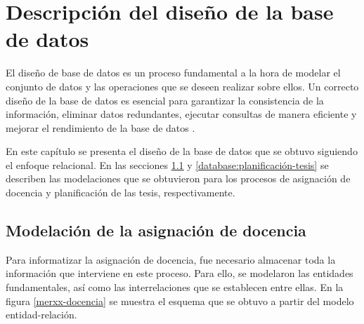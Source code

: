 \chapter{Descripción del diseño de la base de datos}\label{chapter:database}

El diseño de base de datos es un proceso fundamental a la hora 
de modelar el conjunto de datos y las operaciones que se deseen
realizar sobre ellos. Un correcto diseño de la base de datos
es esencial para garantizar la consistencia de la información,
eliminar datos redundantes, ejecutar consultas de manera 
eficiente y mejorar el rendimiento de la base de datos \cite{db_book_cap2}. 

En este capítulo se presenta el diseño de la base de datos que se 
obtuvo siguiendo el enfoque relacional.
En las secciones \ref{database:asignación-docencia} y
\ref{database:planificación-tesis} se describen las modelaciones que se obtuvieron 
para los procesos de asignación de docencia y planificación de las tesis, respectivamente.






\section{Modelación de la asignación de docencia}\label{database:asignación-docencia}
Para informatizar la asignación de docencia, fue 
necesario almacenar toda la información que interviene en este proceso.
Para ello, se modelaron las entidades fundamentales, así como las interrelaciones
que se establecen entre ellas. En la figura \ref{merxx-docencia} se muestra el esquema que se obtuvo a partir 
del modelo entidad-relación.


